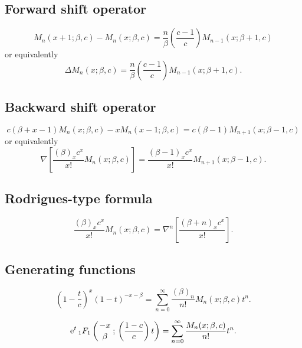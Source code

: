 \documentclass[envcountchap,graybox]{svmono}
\newcommand{\hyp}[5]{\mbox{}_{#1}{F}_{#2}
\left(\genfrac{}{}{0pt}{}{#3}{#4}\,;\,#5\right)}
\newcommand{\e}{\textrm{e}}
\newcommand{\hyp}[5]{\,\mbox{}_{#1}F_{#2}\!\left(
  \genfrac{}{}{0pt}{}{#3}{#4};#5\right)}
\begin{document}
\subsection*{Forward shift operator}
\begin{equation}
\label{shift1MeixnerI}
M_n(x+1;\beta,c)-M_n(x;\beta,c)=
\frac{n}{\beta}\left(\frac{c-1}{c}\right)M_{n-1}(x;\beta+1,c)
\end{equation}
or equivalently
\begin{equation}
\label{shift1MeixnerII}
\Delta M_n(x;\beta,c)=\frac{n}{\beta}\left(\frac{c-1}{c}\right)M_{n-1}(x;\beta+1,c).
\end{equation}

\subsection*{Backward shift operator}
\begin{equation}
\label{shift2MeixnerI}
c(\beta+x-1)M_n(x;\beta,c)-xM_n(x-1;\beta,c)=c(\beta-1)M_{n+1}(x;\beta-1,c)
\end{equation}
or equivalently
\begin{equation}
\label{shift2MeixnerII}
\nabla\left[\frac{(\beta)_xc^x}{x!}M_n(x;\beta,c)\right]=
\frac{(\beta-1)_xc^x}{x!}M_{n+1}(x;\beta-1,c).
\end{equation}

\subsection*{Rodrigues-type formula}
\begin{equation}
\label{RodMeixner}
\frac{(\beta)_xc^x}{x!}M_n(x;\beta,c)=\nabla^n\left[\frac{(\beta+n)_xc^x}{x!}\right].
\end{equation}

\subsection*{Generating functions}
\begin{equation}
\label{GenMeixner1}
\left(1-\frac{t}{c}\right)^x(1-t)^{-x-\beta}=
\sum_{n=0}^{\infty}\frac{(\beta)_n}{n!}M_n(x;\beta,c)t^n.
\end{equation}

\begin{equation}
\label{GenMeixner2}
\e^t\,\hyp{1}{1}{-x}{\beta}{\left(\frac{1-c}{c}\right)t}=
\sum_{n=0}^{\infty}\frac{M_n(x;\beta,c)}{n!}t^n.
\end{equation}
\end{document}

